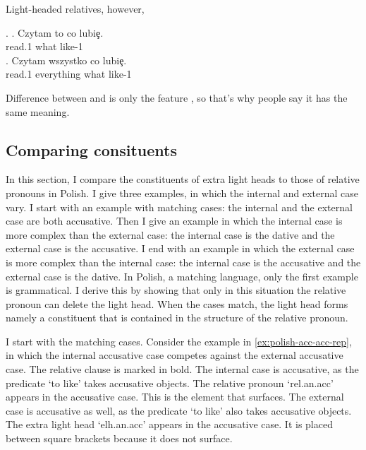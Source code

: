 Light-headed relatives, however,

\ex.
\ag. Czytam to co lubiȩ.\\
 read.1  what like-1\\
\bg. Czytam wszystko co lubiȩ.\\
read.1 everything what like-1\\ 








Difference between  and  is only the feature , so that's why people say it has the same meaning.





\subsection{Comparing consituents}\label{sec:comparing-polish}

In this section, I compare the constituents of extra light heads to those of relative pronouns in Polish. I give three examples, in which the internal and external case vary.
I start with an example with matching cases: the internal and the external case are both accusative.
Then I give an example in which the internal case is more complex than the external case: the internal case is the dative and the external case is the accusative.
I end with an example in which the external case is more complex than the internal case: the internal case is the accusative and the external case is the dative.
In Polish, a matching language, only the first example is grammatical. I derive this by showing that only in this situation the relative pronoun can delete the light head. When the cases match, the light head forms namely a constituent that is contained in the structure of the relative pronoun.

I start with the matching cases.
Consider the example in \ref{ex:polish-acc-acc-rep}, in which the internal accusative case competes against the external accusative case. The relative clause is marked in bold.
The internal case is accusative, as the predicate  `to like' takes accusative objects. The relative pronoun  `\ac{rel}.\ac{an}.\ac{acc}' appears in the accusative case. This is the element that surfaces.
The external case is accusative as well, as the predicate  `to like' also takes accusative objects. The extra light head  `\ac{elh}.\ac{an}.\ac{acc}' appears in the accusative case. It is placed between square brackets because it does not surface.

